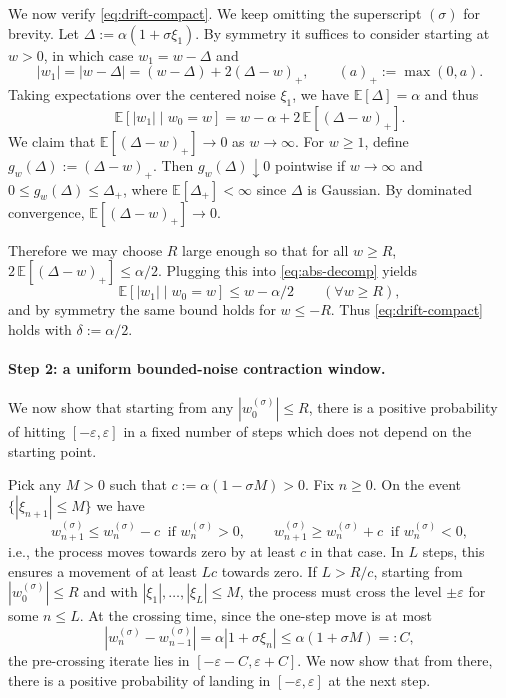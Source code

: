 \documentclass{article}
\theoremstyle{plain}
\theoremstyle{definition}
\theoremstyle{remark}
\newcommand{\E}{\mathbb{E}}
\newcommand{\stepsize}{\alpha}
\newcommand{\eps}{\varepsilon}
\begin{document}
We now verify \eqref{eq:drift-compact}. We keep omitting the superscript $(\sigma)$ for brevity. 
Let $\Delta:=\stepsize(1+\sigma\xi_1)$. By symmetry it suffices to consider starting at $w>0$, in which case
$w_1=w-\Delta$ and
\[
|w_1|=|w-\Delta|=(w-\Delta)+2(\Delta-w)_+,
\qquad (a)_+:=\max(0,a).
\]
Taking expectations over the centered noise $\xi_1$, 
we have  $\E[\Delta]=\stepsize$ and thus
\begin{equation}
\label{eq:abs-decomp}
\E[|w_1| \mid w_0=w]= w-\stepsize + 2\,\E[(\Delta-w)_+].
\end{equation}
We claim that $\E[(\Delta-w)_+]\to 0$ as $w\to\infty$.
For $w\ge1$, define $g_w(\Delta):=(\Delta-w)_+$. Then $g_w(\Delta)\downarrow 0$ pointwise if $w\to\infty$ and
$0\le g_w(\Delta)\le \Delta_+$, where $\E[\Delta_+]<\infty$ since $\Delta$ is Gaussian.
By dominated convergence, $\E[(\Delta-w)_+]\to0$.

Therefore we may choose $R$ large enough so that for all $w\ge R$,
$2\,\E[(\Delta-w)_+]\le \stepsize/2$. Plugging this into \eqref{eq:abs-decomp} yields
\[
\E[|w_1|\mid w_0=w]\le w-\stepsize/2 \qquad (\forall w\ge R),
\]
and by symmetry the same bound holds for $w\le -R$.
Thus \eqref{eq:drift-compact} holds with $\delta:=\stepsize/2$.


\paragraph{Step 2: a uniform bounded-noise contraction window.}  
We now show that starting from any $|w_0^{(\sigma)}|\le R$, 
there is a positive probability of hitting $[-\eps,\eps]$ in a fixed number of steps 
which does not depend on the starting point. 

Pick any $M>0$ such that $c:=\stepsize(1-\sigma M)>0$.  
Fix $n\ge0$. On the event $\{|\xi_{n+1}|\le M\}$ we have 
\begin{equation}
\label{eq:one-step-bounds}
  w_{n+1}^{(\sigma)} \le w_n^{(\sigma)} - c \ \text{ if } w_n^{(\sigma)} > 0,
  \qquad
  w_{n+1}^{(\sigma)} \ge w_n^{(\sigma)} + c \ \text{ if } w_n^{(\sigma)} < 0,
\end{equation}
i.e., the process moves towards zero by at least $c$ in that case. 
In $L$ steps, this ensures a movement of at least $Lc$ towards zero. 
If $L> R/c$, starting from $|w_0^{(\sigma)}|\le R$ and with
$|\xi_1|,\dots,|\xi_L|\le M$, the process must cross 
the level $\pm \eps$ for some
$n\le L$. 
At the crossing time, 
since the one-step move is at most
\begin{equation}
\label{eq:step-bound}
  |w_{n}^{(\sigma)} - w_{n-1}^{(\sigma)}|
  = \stepsize|1+\sigma\xi_n|
  \le \stepsize(1+\sigma M) =: C,
\end{equation}
the pre-crossing iterate lies in $[-\eps-C,\eps+C]$. 
We now show that from there, there is a positive probability of landing in $[-\eps,\eps]$ at the next step. 
\end{document}
